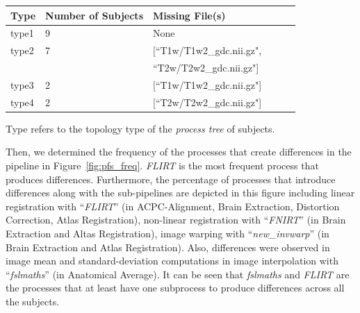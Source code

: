 \documentclass[a4paper,num-refs]{oup-contemporary}
\begin{document}
{\begin{table}
\begin{threeparttable}
\begin{tabular}{@{}llllll@{}}
\toprule
Type   & Number of Subjects  & Missing File(s)                                    \\ \midrule
type1  & 9                   & None                                               \\
type2  & 7                   & [``T1w/T1w2\_gdc.nii.gz",                          \\
       &                     &  ``T2w/T2w2\_gdc.nii.gz"]                          \\
type3  & 2                   & [``T1w/T1w2\_gdc.nii.gz"]                          \\
type4  & 2                   & [``T2w/T2w2\_gdc.nii.gz"]                          \\ \bottomrule
\end{tabular}
\begin{tablenotes}
     \small
     \item *Type refers to the topology type of the \emph{process tree} of subjects.
\end{tablenotes}
\end{threeparttable}
\label{table:data-clusters}
\end{table}

Then, we determined the frequency of the processes that create differences in 
the pipeline in Figure~\ref{fig:pfs_freq}. \emph{FLIRT} is the most frequent 
process that produces differences.
Furthermore, the percentage of processes that introduce differences 
along with the 
sub-pipelines are depicted in this figure 
including linear registration with “\emph{FLIRT}” (in 
ACPC-Alignment, Brain Extraction, Distortion Correction, 
Atlas Registration), non-linear registration with “\emph{FNIRT}” (in 
Brain Extraction and Altas Registration), image warping with 
“\emph{new\_invwarp}” (in Brain Extraction and Atlas Registration). 
Also, differences were observed in image mean and standard-deviation 
computations in image interpolation with “\emph{fslmaths}” (in Anatomical Average). 
It can be seen that \emph{fslmaths} and \emph{FLIRT} 
are the processes that at least have one subprocess to produce differences across all the subjects.



}
\end{document}
